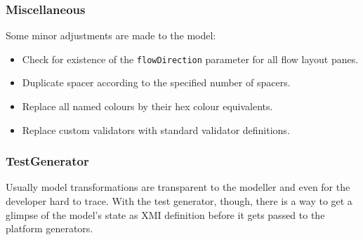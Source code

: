 \subsubsection{Miscellaneous}
Some minor adjustments are made to the model:

\begin{itemize}
\item Check for existence of the \lstinline!flowDirection! parameter for all flow layout panes.
\item Duplicate spacer according to the specified number of spacers.
\item Replace all named colours by their hex colour equivalents.
\item Replace custom validators with standard validator definitions.
\end{itemize}

\subsubsection{TestGenerator}
Usually model transformations are transparent to the modeller and even for the developer hard to trace. With the test generator, though, there is a way to get a glimpse of the model's state as XMI definition before it gets passed to the platform generators.
